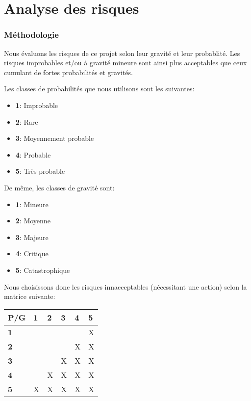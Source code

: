 \chapter*{Analyse des risques}

\subsection*{Méthodologie}

Nous évaluons les risques de ce projet selon leur gravité et leur probablité. Les risques improbables et/ou à gravité mineure sont ainsi plus acceptables que ceux cumulant de fortes probabilités et gravités.

Les classes de probabilités que nous utilisons sont les suivantes:

\begin{itemize}
  \item \textbf{1}: Improbable 
  \item \textbf{2}: Rare
  \item \textbf{3}: Moyennement probable
  \item \textbf{4}: Probable
  \item \textbf{5}: Très probable
\end{itemize}

De même, les classes de gravité sont:

\begin{itemize}
  \item \textbf{1}: Mineure 
  \item \textbf{2}: Moyenne
  \item \textbf{3}: Majeure
  \item \textbf{4}: Critique
  \item \textbf{5}: Catastrophique
\end{itemize}

Nous choisissons donc les risques innacceptables (nécessitant une action) selon la matrice suivante:

\begin{tabular}{|l|l|l|l|l|l|}
     \hline
         P/G & \textbf{1} & \textbf{2} & \textbf{3} & \textbf{4} & \textbf{5}  \\ \hline
         \textbf{1} &   &   &   &   & X \\ \hline
         \textbf{2} &   &   &   & X & X \\ \hline
         \textbf{3} &   &   & X & X & X \\ \hline
         \textbf{4} &   & X & X & X & X \\ \hline
         \textbf{5} & X & X & X & X & X \\
     \hline
\end{tabular}

